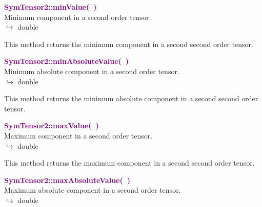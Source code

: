\textcolor{purple}{\textbf{SymTensor2::minValue(~)}}\label{SymTensor2::minValue()}\\
Minimum component in a second order tensor.\\ \hspace*{10mm}$\hookrightarrow$ double

This method returns the minimum component in a second second order tensor.

\textcolor{purple}{\textbf{SymTensor2::minAbsoluteValue(~)}}\label{SymTensor2::minAbsoluteValue()}\\
Minimum absolute component in a second order tensor.\\ \hspace*{10mm}$\hookrightarrow$ double

This method returns the minimum absolute component in a second second order tensor.

\textcolor{purple}{\textbf{SymTensor2::maxValue(~)}}\label{SymTensor2::maxValue()}\\
Maximum component in a second order tensor.\\ \hspace*{10mm}$\hookrightarrow$ double

This method returns the maximum component in a second second order tensor.

\textcolor{purple}{\textbf{SymTensor2::maxAbsoluteValue(~)}}\label{SymTensor2::maxAbsoluteValue()}\\
Maximum absolute component in a second order tensor.\\ \hspace*{10mm}$\hookrightarrow$ double

